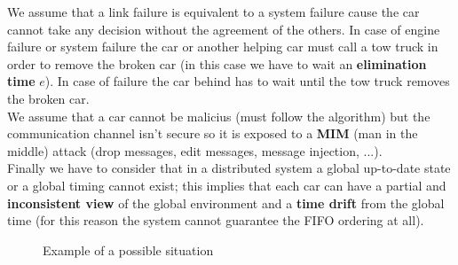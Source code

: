 We assume that a link failure is equivalent to a system failure cause the car cannot 
take any decision without the agreement of the others. 
In case of engine failure or system failure the car or another helping car must call 
a tow truck in order to remove the broken car 
(in this case we have to wait an \textbf{elimination time} $e$).
In case of failure the car behind has to wait until the tow truck removes the broken car.\\

We assume that a car cannot be malicius (must follow the algorithm) but the communication 
channel isn't secure so it is exposed to a \textbf{MIM} (man in the middle) attack 
(drop messages, edit messages, message injection, ...).\\

Finally we have to consider that in a distributed system a global up-to-date state 
or a global timing cannot exist; this implies that each car can have a partial 
and \textbf{inconsistent view} of the global environment and a \textbf{time drift} 
from the global time (for this reason the system cannot guarantee the FIFO ordering 
at all).

\begin{figure}[h]
    \centering
    \caption{Example of a possible situation} \label{fig:1}
\end{figure}


